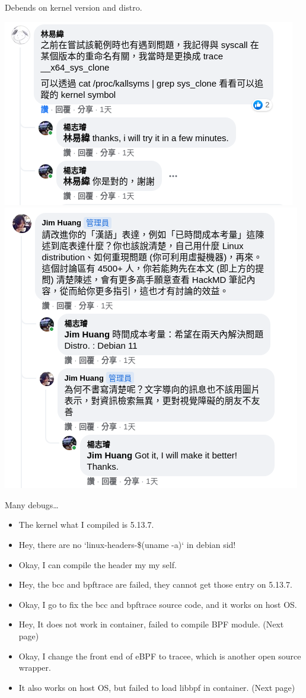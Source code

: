 \documentclass{beamer}
\begin{document}
\begin{CJK*}{UTF8}{bsmi}
  \begin{frame}{Debends on kernel version and distro.}
    \begin{multicols*}{2}
      \includegraphics[width=.5\textwidth]{Screenshot_2021-08-06_06-22-21.png}
      \includegraphics[width=.5\textwidth]{Screenshot_2021-08-06_06-22-40.png}
    \end{multicols*}
  \end{frame}

  \begin{frame}{Many debugs\dots}
    \begin{itemize}
      \item The kernel what I compiled is 5.13.7.
      \item Hey, there are no `linux-headers-\$(uname -a)` in debian sid!
      \item Okay, I can compile the header my my self.
      \item Hey, the bcc and bpftrace are failed, they cannot get those entry on 5.13.7.
      \item Okay, I go to fix the bcc and bpftrace source code, and it works on host OS.
      \item Hey, It does not work in container, failed to compile BPF module. (Next page)
      \item Okay, I change the front end of eBPF to tracee, which is another open source wrapper.
      \item It also works on host OS, but failed to load libbpf in container. (Next page)
    \end{itemize}
  \end{frame}


\end{CJK*}
\end{document}
